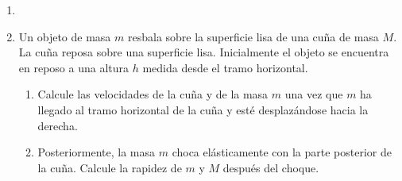 \documentclass[letterpaper,11pt]{article}
\begin{document}
\vspace{-1cm}
\begin{enumerate}\setlength{\itemsep}{0.4cm}

\item[]

    
    


\item Un objeto de masa $m$ resbala sobre la superficie lisa de una cuña de masa $M$. La cuña reposa sobre una superficie lisa. Inicialmente el objeto se encuentra en reposo a una altura $h$ medida desde el tramo horizontal.

\begin{multicols}{2}
    
    \begin{enumerate}
        \item Calcule las velocidades de la cuña y de la masa $m$ una vez que $m$ ha llegado al tramo horizontal de la cuña y esté desplazándose hacia la derecha.
        
        \item Posteriormente, la masa $m$ choca elásticamente con la parte posterior de la cuña. Calcule la rapidez de $m$ y $M$ después del choque.
    \end{enumerate}
    

\end{multicols}
\end{enumerate}
\end{document}
